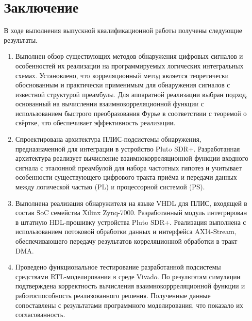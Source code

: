 

\section*{Заключение}

В ходе выполнения выпускной квалификационной работы получены следующие результаты.

\begin{enumerate}
	\item Выполнен обзор существующих методов обнаружения цифровых сигналов и особенностей их реализации на программируемых логических интегральных схемах. Установлено, что корреляционный метод является теоретически обоснованным и практически применимым для обнаружения сигналов с известной структурой преамбулы. Для аппаратной реализации выбран подход, основанный на вычислении взаимнокорреляционной функции с использованием быстрого преобразования Фурье в соответствии с теоремой о свёртке, что обеспечивает эффективность реализации.
	
	\item Спроектирована архитектура ПЛИС-подсистемы обнаружения, предназначенной для интеграции в устройство Pluto SDR+. Разработанная архитектура реализует вычисление взаимнокорреляционной функции входного сигнала с эталонной преамбулой для набора частотных гипотез и учитывает особенности существующего цифрового тракта приёма и передачи данных между логической частью (PL) и процессорной системой (PS).
	
	\item Выполнена реализация обнаружителя на языке VHDL для ПЛИС, входящей в состав SoC семейства Xilinx Zynq-7000. Разработанный модуль интегрирован в штатную HDL-прошивку устройства Pluto SDR+. Реализация выполнена с использованием потоковой обработки данных и интерфейса AXI4-Stream, обеспечивающего передачу результатов корреляционной обработки в тракт DMA.
	
	\item Проведено функциональное тестирование разработанной подсистемы средствами RTL-моделирования в среде Vivado. По результатам симуляции подтверждена корректность вычисления взаимнокоррреляционной функции и работоспособность реализованного решения. Полученные данные сопоставлены с результатами программного моделирования, что показало их согласованность.
\end{enumerate}





